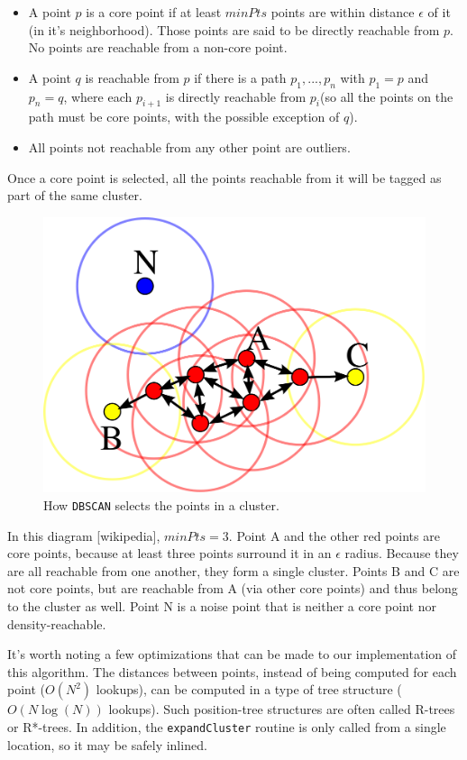 \documentclass[12pt]{article}
\begin{document}
\begin{itemize}
\item A point $p$ is a core point if at least $minPts$ points are within distance $\epsilon$ of it (in it's neighborhood). Those points are said to be directly reachable from $p$. No points are reachable from a non-core point.
\item A point $q$ is reachable from $p$ if there is a path $p_1, ..., p_n$ with $p_1 = p$ and $p_n = q$, where each $p_{i+1}$ is directly reachable from $p_i $(so all the points on the path must be core points, with the possible exception of $q$).
\item All points not reachable from any other point are outliers.
\end{itemize}

Once a core point is selected, all the points reachable from it will be tagged as part of the same cluster.

\begin{figure}[ht]
\centering
\includegraphics[width=0.8\linewidth]{DBSCAN-Illustration}
\caption{How \texttt{DBSCAN} selects the points in a cluster.}
\label{fig:DBSCAN}
\end{figure}

In this diagram [wikipedia], $minPts = 3$. Point A and the other red points are core points, because at least three points surround it in an $\epsilon$  radius. Because they are all reachable from one another, they form a single cluster. Points B and C are not core points, but are reachable from A (via other core points) and thus belong to the cluster as well. Point N is a noise point that is neither a core point nor density-reachable.

\par It's worth noting a few optimizations that can be made to our implementation of this algorithm.
The distances between points, instead of being computed for each point ($O(N^2)$ lookups), can be computed in a type of tree structure ($O(N \log(N))$ lookups). Such position-tree structures are often called R-trees or R*-trees.
In addition, the \texttt{expandCluster} routine is only called from a single location, so it may be safely inlined.
\end{document}
